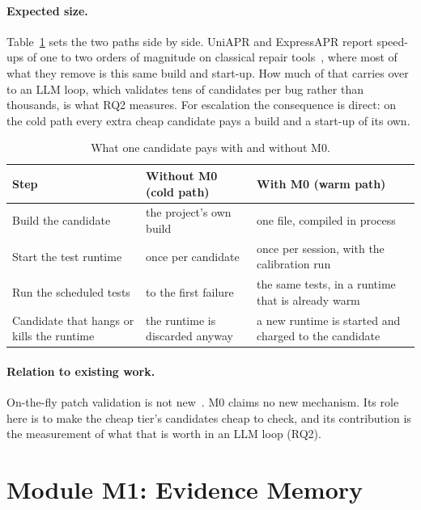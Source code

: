 \paragraph{Expected size.} Table~\ref{tab:sys-m0} sets the two paths side by
side. UniAPR and ExpressAPR report speed-ups of one to two orders of magnitude
on classical repair tools~\citep{chen2021uniapr,xiao2024expressapr}, where
most of what they remove is this same build and start-up. How much of that
carries over to an LLM loop, which validates tens of candidates per bug
rather than thousands, is what RQ2 measures. For escalation the consequence is
direct: on the cold path every extra cheap candidate pays a build and a
start-up of its own.

\begin{table}[htbp]
\centering
\caption{What one candidate pays with and without M0.}
\label{tab:sys-m0}
\footnotesize
\begin{tabularx}{\textwidth}{@{}>{\raggedright\arraybackslash}p{} >{\raggedright\arraybackslash}p{} >{\raggedright\arraybackslash}X@{}}
\toprule
Step & Without M0 (cold path) & With M0 (warm path)\\
\midrule
Build the candidate & the project's own build & one file, compiled in process\\
Start the test runtime & once per candidate & once per session, with the calibration run\\
Run the scheduled tests & to the first failure & the same tests, in a runtime that is already warm\\
Candidate that hangs or kills the runtime & the runtime is discarded anyway & a new runtime is started and charged to the candidate\\
\bottomrule
\end{tabularx}
\end{table}

\paragraph{Relation to existing work.} On-the-fly patch validation is not
new~\citep{chen2021uniapr,xiao2024expressapr}. M0 claims no new mechanism. Its
role here is to make the cheap tier's candidates cheap to check, and its
contribution is the measurement of what that is worth in an LLM loop (RQ2).

\section{Module M1: Evidence Memory}
\label{sec:sys-memory}

